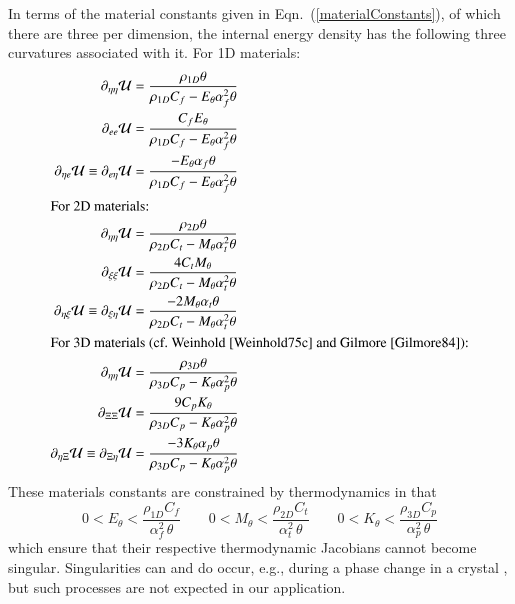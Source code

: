 In terms of the material constants given in Eqn.~(\ref{materialConstants}), of which there are three per dimension, the internal energy density has the following three curvatures associated with it.  For 1D materials:
\begin{subequations}
    \label{internalEnergies}
    \begin{align}
    \partial_{\eta\eta} \mathcal{U} & = 
    \frac{\rho_{1D}\theta}{\rho_{1D} C_f - E_{\theta} \alpha_f^2 \theta } \\
    \partial_{ee} \mathcal{U} & = \frac{C_f E_{\theta}}
    {\rho_{1D} C_f - E_{\theta} \alpha_f^2 \theta} \\
    \partial_{\eta e} \mathcal{U} \equiv \partial_{e \eta} \mathcal{U} & = 
    \frac{-E_{\theta} \alpha_f \theta}{\rho_{1D} C_f - E_{\theta} \alpha_f^2 \theta} \\
    \intertext{For 2D materials:}
    \partial_{\eta\eta} \mathcal{U} & = 
    \frac{\rho_{2D} \theta}{\rho_{2D} C_t - M_{\theta} \alpha_t^2 \theta} \\
    \partial_{\xi\xi} \mathcal{U} & = \frac{4 C_t M_{\theta}}
    {\rho_{2D} C_t - M_{\theta} \alpha_t^2 \theta} \\
    \partial_{\eta \xi} \mathcal{U} \equiv \partial_{\xi \eta} \mathcal{U} & = 
    \frac{-2M_{\theta} \alpha_t \theta}
    {\rho_{2D} C_t - M_{\theta} \alpha_t^2 \theta} \\
    \intertext{For 3D materials (cf.\ Weinhold \cite{Weinhold75c} and Gilmore \cite{Gilmore84}):}
    \partial_{\eta\eta} \mathcal{U} & = 
    \frac{\rho_{3D} \theta}{\rho_{3D} C_p - K_{\theta} \alpha_p^2 \theta} \\
    \partial_{\Xi\Xi} \mathcal{U} & = \frac{9 C_p K_{\theta}}
    {\rho_{3D} C_p - K_{\theta} \alpha_p^2 \theta} \\
    \partial_{\eta\Xi} \mathcal{U} \equiv 
    \partial_{\Xi\eta} \mathcal{U} & = 
    \frac{-3K_{\theta} \alpha_p \theta}{\rho_{3D} C_p - K_{\theta} \alpha_p^2 \theta}
    \end{align}
\end{subequations}
These materials constants are constrained by thermo\-dynamics in that
\begin{equation}
    \label{thermodynamicConstraints}
    0 < E_{\theta} < \frac{\rho_{1D} C_f}{\alpha_f^2 \, \theta} \qquad
    0 < M_{\theta} < \frac{\rho_{2D} C_t}{\alpha_t^2 \, \theta} \qquad
    0 < K_{\theta} < \frac{\rho_{3D} C_p}{\alpha_p^2 \, \theta}
\end{equation} 
which ensure that their respective thermo\-dynamic Jacobians cannot become singular. Singularities can and do occur, e.g., during a phase change in a crystal \cite{McLellan76,Gilmore84}, but such processes are not expected in our application.

